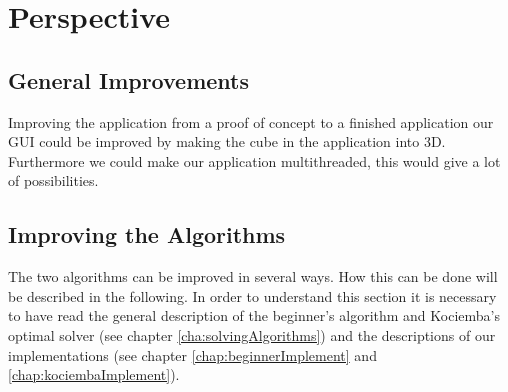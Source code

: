\chapter{Perspective}

\section{General Improvements}
Improving the application from a proof of concept to a finished application our GUI could be improved by making the cube in the application into 3D. Furthermore we could make our application multithreaded, this would give a lot of possibilities. 


\section{Improving the Algorithms}
The two algorithms can be improved in several ways. How this can be done will be described in the following.
In order to understand this section it is necessary to have read the general description of the beginner's algorithm and Kociemba's optimal solver (see chapter \ref{cha:solvingAlgorithms}) and the descriptions of our implementations (see chapter \ref{chap:beginnerImplement} and \ref{chap:kociembaImplement}).


